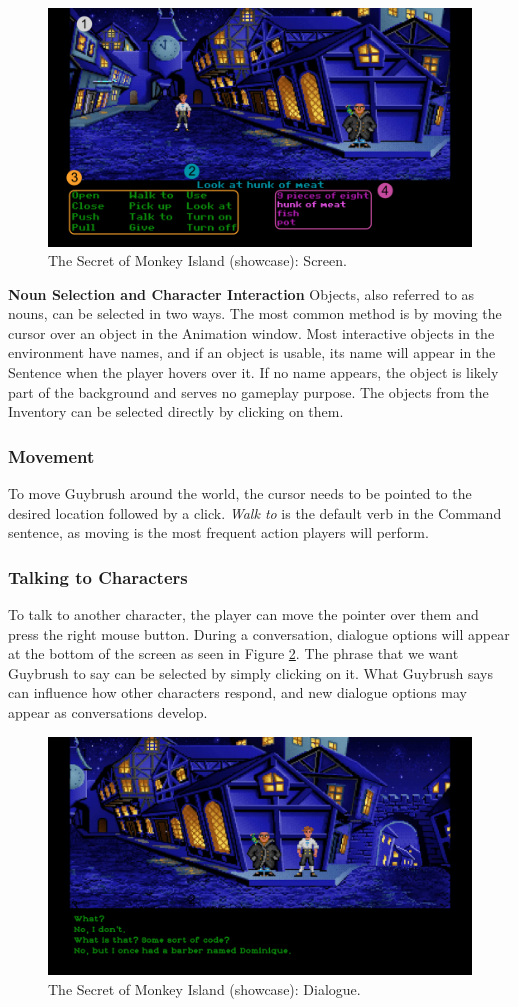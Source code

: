 \begin{figure}[H]
\centering
\includegraphics[width=.8\linewidth]{img/tutorial-tsomi.png}
\caption{The Secret of Monkey Island (showcase): Screen.}
\label{fig:TSoM-manual}
\end{figure}

\textbf{Noun Selection and Character Interaction}
Objects, also referred to as nouns, can be selected in two ways. The most common method is by moving the cursor over an object in the Animation window. Most interactive objects in the environment have names, and if an object is usable, its name will appear in the Sentence when the player hovers over it. If no name appears, the object is likely part of the background and serves no gameplay purpose. The objects from the Inventory can be selected directly by clicking on them.

\subsubsection{Movement}
To move Guybrush around the world, the cursor needs to be pointed to the desired location followed by a click. \textit{Walk to} is the default verb in the Command sentence, as moving is the most frequent action players will perform.

\subsubsection{Talking to Characters}
To talk to another character, the player can move the pointer over them and press the right mouse button. During a conversation, dialogue options will appear at the bottom of the screen as seen in Figure \ref{fig:TSoM-manual2}.  The phrase that we want Guybrush to say can be selected by simply clicking on it. What Guybrush says can influence how other characters respond, and new dialogue options may appear as conversations develop.

\begin{figure}[H]
\centering
\includegraphics[width=.8\linewidth]{img/manual-tsomi.png}
\caption{The Secret of Monkey Island (showcase): Dialogue.}
\label{fig:TSoM-manual2}
\end{figure}